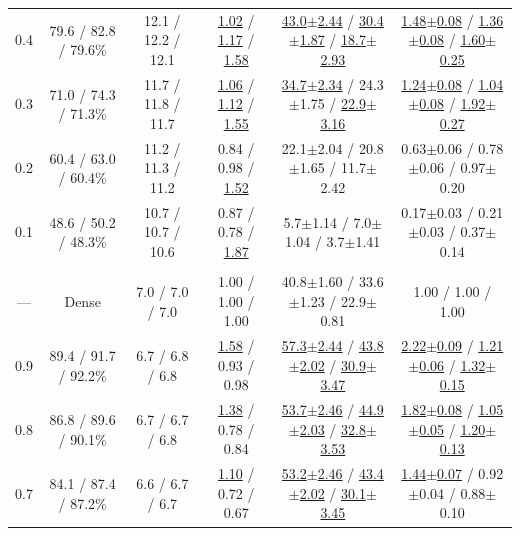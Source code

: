 \begin{table}[!t]
\begin{tabular}{c c c c c c}
0.4 & 79.6 / 82.8 / 79.6\% & 12.1 / 12.2 / 12.1 & \underline{1.02} / \underline{1.17} / \underline{1.58} & \underline{43.0{\scriptsize$\pm$2.44}} / \underline{30.4{\scriptsize$\pm$1.87}} / \underline{18.7{\scriptsize$\pm$2.93}} & \underline{1.48{\scriptsize$\pm$0.08}} / \underline{1.36{\scriptsize$\pm$0.08}} / \underline{1.60{\scriptsize$\pm$0.25}} \\
0.3 & 71.0 / 74.3 / 71.3\% & 11.7 / 11.8 / 11.7 & \underline{1.06} / \underline{1.12} / \underline{1.55} & \underline{34.7{\scriptsize$\pm$2.34}} / 24.3{\scriptsize$\pm$1.75} / \underline{22.9{\scriptsize$\pm$3.16}} & \underline{1.24{\scriptsize$\pm$0.08}} / \underline{1.04{\scriptsize$\pm$0.08}} / \underline{1.92{\scriptsize$\pm$0.27}} \\
0.2 & 60.4 / 63.0 / 60.4\% & 11.2 / 11.3 / 11.2 & 0.84 / 0.98 / \underline{1.52} & 22.1{\scriptsize$\pm$2.04} / 20.8{\scriptsize$\pm$1.65} / 11.7{\scriptsize$\pm$2.42} & 0.63{\scriptsize$\pm$0.06} / 0.78{\scriptsize$\pm$0.06} / 0.97{\scriptsize$\pm$0.20} \\
0.1 & 48.6 / 50.2 / 48.3\% & 10.7 / 10.7 / 10.6 & 0.87 / 0.78 / \underline{1.87} & 5.7{\scriptsize$\pm$1.14} / 7.0{\scriptsize$\pm$1.04} / 3.7{\scriptsize$\pm$1.41} & 0.17{\scriptsize$\pm$0.03} / 0.21{\scriptsize$\pm$0.03} / 0.37{\scriptsize$\pm$0.14} \\
\addlinespace[0.5pt]
\rowcolor{lightgray} \multicolumn{6}{c}{\rule{0pt}{2.2ex}\textbf{Qwen2.5-7B}\rule[-0.8ex]{0pt}{0pt}} \\
--- & Dense & 7.0 / 7.0 / 7.0 & 1.00 / 1.00 / 1.00 & 40.8{\scriptsize$\pm$1.60} / 33.6{\scriptsize$\pm$1.23} / 22.9{\scriptsize$\pm$0.81} & 1.00 / 1.00 / 1.00 \\
0.9 & 89.4 / 91.7 / 92.2\% & 6.7 / 6.8 / 6.8 & \underline{1.58} / 0.93 / 0.98 & \underline{57.3{\scriptsize$\pm$2.44}} / \underline{43.8{\scriptsize$\pm$2.02}} / \underline{30.9{\scriptsize$\pm$3.47}} & \underline{2.22{\scriptsize$\pm$0.09}} / \underline{1.21{\scriptsize$\pm$0.06}} / \underline{1.32{\scriptsize$\pm$0.15}} \\
0.8 & 86.8 / 89.6 / 90.1\% & 6.7 / 6.7 / 6.8 & \underline{1.38} / 0.78 / 0.84 & \underline{53.7{\scriptsize$\pm$2.46}} / \underline{44.9{\scriptsize$\pm$2.03}} / \underline{32.8{\scriptsize$\pm$3.53}} & \underline{1.82{\scriptsize$\pm$0.08}} / \underline{1.05{\scriptsize$\pm$0.05}} / \underline{1.20{\scriptsize$\pm$0.13}} \\
0.7 & 84.1 / 87.4 / 87.2\% & 6.6 / 6.7 / 6.7 & \underline{1.10} / 0.72 / 0.67 & \underline{53.2{\scriptsize$\pm$2.46}} / \underline{43.4{\scriptsize$\pm$2.02}} / \underline{30.1{\scriptsize$\pm$3.45}} & \underline{1.44{\scriptsize$\pm$0.07}} / 0.92{\scriptsize$\pm$0.04} / 0.88{\scriptsize$\pm$0.10} \\

\end{tabular}
\end{table}
